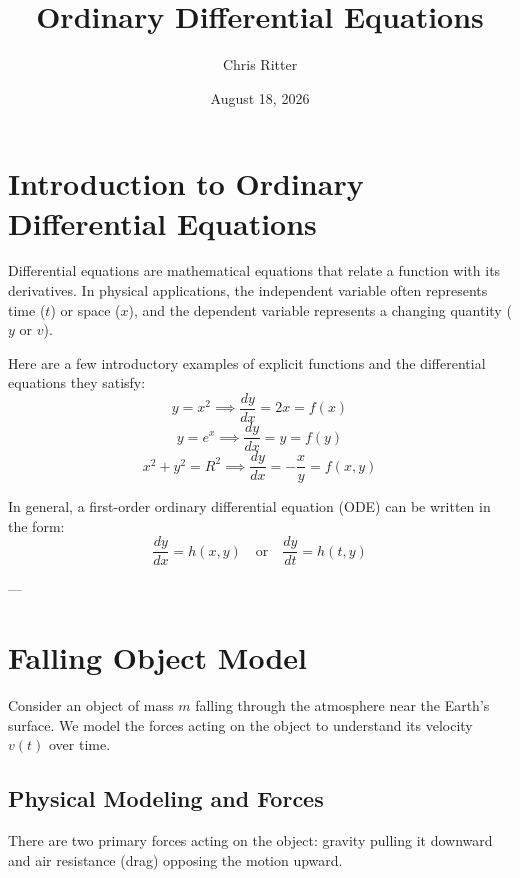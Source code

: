 \documentclass[11pt]{article}
\title{Ordinary Differential Equations}
\author{Chris Ritter}
\date{August 18, 2026}
\begin{document}
\maketitle
\tableofcontents
\newpage

\section{Introduction to Ordinary Differential Equations}
Differential equations are mathematical equations that relate a function with its derivatives. In physical applications, the independent variable often represents time ($t$) or space ($x$), and the dependent variable represents a changing quantity ($y$ or $v$).

Here are a few introductory examples of explicit functions and the differential equations they satisfy:
\[
  y = x^2 \implies \frac{dy}{dx} = 2x = f(x)
\]
\[
  y = e^x \implies \frac{dy}{dx} = y = f(y)
\]
\[
  x^2 + y^2 = R^2 \implies \frac{dy}{dx} = -\frac{x}{y} = f(x,y)
\]

In general, a first-order ordinary differential equation (ODE) can be written in the form:
\[
  \frac{dy}{dx} = h(x,y) \quad \text{or} \quad \frac{dy}{dt} = h(t,y)
\]

---

\section{Falling Object Model}
Consider an object of mass $m$ falling through the atmosphere near the Earth's surface. We model the forces acting on the object to understand its velocity $v(t)$ over time.

\subsection{Physical Modeling and Forces}
There are two primary forces acting on the object: gravity pulling it downward and air resistance (drag) opposing the motion upward.

\begin{center}
\end{center}
\end{document}
